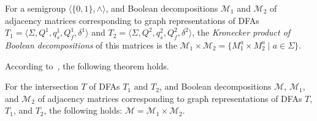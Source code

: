 \begin{definition}\label{def:FAkron}
For a semigroup $\langle \{0, 1\}, \wedge \rangle$, and  Boolean decompositions $\mathcal{M}_1$ and $\mathcal{M}_2$ of adjacency matrices corresponding to graph representations of DFAs $T_1 = \langle \Sigma, Q^1, q_s^1, Q_f^1, \delta^1 \rangle$ and $T_2 = \langle \Sigma, Q^2, q_s^2, Q_f^ 2, \delta^2 \rangle$, the \textit{Kronecker product of Boolean decompositions} of this matrices is the $\mathcal{M}_1 \times \mathcal{M}_2 = \{M^a_1 \times M^a_2 \mid a \in \Sigma\}$.
\end{definition}

According to~\cite{rivera2017euro}, the following theorem holds.

\begin{theorem}\label{thm:FAintersection_and_kron}
For the intersection $T$ of DFAs $T_1$ and $T_2$, and Boolean decompositions $\mathcal{M}$, $\mathcal{M}_1$, and $\mathcal{M}_2$ of adjacency matrices corresponding to graph representations of DFAs $T$, $T_1$, and $T_2$, the following holds: $\mathcal{M} = \mathcal{M}_1 \times \mathcal{M}_2$.
\end{theorem}
 
